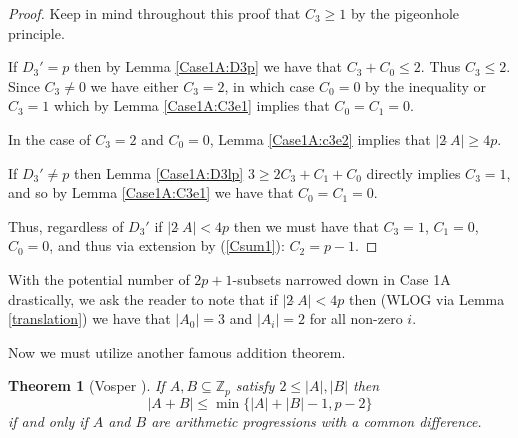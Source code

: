 \documentclass[a4paper, 12pt]{article}\usepackage[english]{babel}
\newtheorem{thm}{Theorem}[section]
\newcommand{\Z}{\mathbb{Z}}
\newcommand{\<}{\langle}
\begin{document}
\begin{proof}
Keep in mind throughout this proof that $C_3\geq 1$ by the pigeonhole principle.

If $D_3'=p$ then by Lemma \ref{Case1A:D3p} we have that $C_3+C_0\leq 2$. Thus $C_3\leq 2$. Since $C_3\neq 0$ we have either $C_3=2$, in which case $C_0=0$ by the inequality or $C_3=1$ which by Lemma \ref{Case1A:C3e1} implies that $C_0=C_1=0$.

In the case of $C_3=2$ and $C_0=0$, Lemma \ref{Case1A:c3e2} implies that $|2\hat{\;}A|\geq 4p$.


If $D_3'\neq p$ then Lemma \ref{Case1A:D3lp} $3\geq 2C_3+C_1+C_0 $ directly implies $C_3=1$, and so by Lemma \ref{Case1A:C3e1} we have that $C_0=C_1=0$.

Thus, regardless of $D_3'$ if $|2\hat{\;}A|<4p$ then we must have that $C_3=1$, $C_1=0$, $C_0=0$, and thus via extension by (\ref{Csum1}): $C_2=p-1$.


    

    \end{proof}

With the potential number of $2p+1$-subsets narrowed down in Case 1A drastically, we ask the reader to note that if $|2\hat{\;}A|<4p$ then (WLOG via Lemma \ref{translation}) we have that $|A_0|=3$ and $|A_i|=2$ for all non-zero $i$.

Now we must utilize another famous addition theorem.

\begin{thm}[Vosper \cite{Vosper}] \label{vosper}
  If $A,B\subseteq \Z_p$ satisfy $2\leq |A|,|B|$ then \[|A+B|\leq \min\{|A|+|B|-1,p-2\}\] if and only if $A$ and $B$ are arithmetic progressions with a common difference.
\end{thm}
\end{document}
